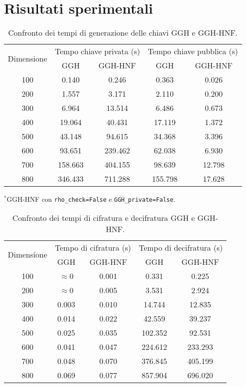 \chapter{Risultati sperimentali}

\begin{table}[htbp]
    \centering
    \begin{tabular}{|c|c|c|c|c|}
        \hline
        \multirow{2}{*}{Dimensione} & 
        \multicolumn{2}{c|}{Tempo chiave privata (s)} & 
        \multicolumn{2}{c|}{Tempo chiave pubblica (s)} \\
        \cline{2-5}
        & GGH & GGH-HNF & GGH & GGH-HNF \\
        \hline
        100 & 0.140 & 0.246 & 0.363 & 0.026 \\
        200 & 1.557 & 3.171 & 2.110 & 0.200 \\
        300 & 6.964 & 13.514 & 6.486 & 0.673 \\
        400 & 19.064 & 40.431 & 17.119 & 1.372 \\
        500 & 43.148 & 94.615 & 34.368 & 3.396 \\
        600 & 93.651 & 239.462 & 62.038 & 6.930 \\
        700 & 158.663 & 404.155 & 98.639 & 12.798 \\
        800 & 346.433 & 711.288 & 155.798 & 17.628 \\
        \hline
    \end{tabular}
    \caption{Confronto dei tempi di generazione delle chiavi GGH e GGH-HNF.}
    \raggedright
    \small{$^*$GGH-HNF con \texttt{rho\_check=False} e \texttt{GGH\_private=False}.}
    \label{tab:key_gen_comparison}
\end{table}


\begin{table}[htbp]
    \centering
    \begin{tabular}{|c|c|c|c|c|}
        \hline
        \multirow{2}{*}{Dimensione} & 
        \multicolumn{2}{c|}{Tempo di cifratura (s)} & 
        \multicolumn{2}{c|}{Tempo di decifratura (s)} \\
        \cline{2-5}
        & GGH & GGH-HNF & GGH & GGH-HNF \\
        \hline
        100 & $\approx$0 & 0.001 & 0.331 & 0.225 \\
        200 & $\approx$0 & 0.005 & 3.531 & 2.924 \\
        300 & 0.003 & 0.010 & 14.744 & 12.835 \\
        400 & 0.014 & 0.022 & 42.559 & 39.237 \\
        500 & 0.025 & 0.035 & 102.352 & 92.531 \\
        600 & 0.041 & 0.047 & 224.612 & 233.293 \\
        700 & 0.048 & 0.070 & 376.845 & 405.199 \\
        800 & 0.069 & 0.077 & 857.904 & 696.020 \\
        \hline
    \end{tabular}
    \caption{Confronto dei tempi di cifratura e decifratura GGH e GGH-HNF.}
    \label{tab:enc_dec_comparison}
\end{table}

